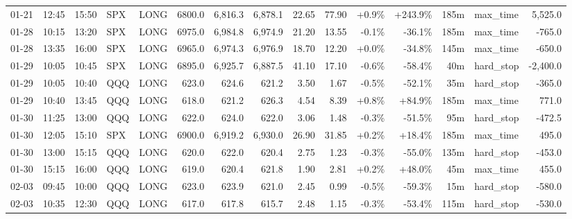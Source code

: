 \documentclass[11pt,a4paper,twoside]{article}
\begin{document}
\begin{landscape}
\begin{center}
\begin{longtable}{>{\color{txtmain}}l l l l l r r r r r r r r >{\color{txtmain}}l r}
01-21 & 12:45 & 15:50 & SPX & LONG & 6800.0 & 6,816.3 & 6,878.1 & 22.65 & 77.90 & \textcolor{wingreen}{+0.9\%} & \textcolor{wingreen}{+243.9\%} & 185m & max\_time & \textcolor{wingreen}{5,525.0} \\
01-28 & 10:15 & 13:20 & SPX & LONG & 6975.0 & 6,984.8 & 6,974.9 & 21.20 & 13.55 & \textcolor{lossred}{-0.1\%} & \textcolor{lossred}{-36.1\%} & 185m & max\_time & \textcolor{lossred}{-765.0} \\
01-28 & 13:35 & 16:00 & SPX & LONG & 6965.0 & 6,974.3 & 6,976.9 & 18.70 & 12.20 & \textcolor{wingreen}{+0.0\%} & \textcolor{lossred}{-34.8\%} & 145m & max\_time & \textcolor{lossred}{-650.0} \\
01-29 & 10:05 & 10:45 & SPX & LONG & 6895.0 & 6,925.7 & 6,887.5 & 41.10 & 17.10 & \textcolor{lossred}{-0.6\%} & \textcolor{lossred}{-58.4\%} & 40m & hard\_stop & \textcolor{lossred}{-2,400.0} \\
01-29 & 10:05 & 10:40 & QQQ & LONG & 623.0 & 624.6 & 621.2 & 3.50 & 1.67 & \textcolor{lossred}{-0.5\%} & \textcolor{lossred}{-52.1\%} & 35m & hard\_stop & \textcolor{lossred}{-365.0} \\
01-29 & 10:40 & 13:45 & QQQ & LONG & 618.0 & 621.2 & 626.3 & 4.54 & 8.39 & \textcolor{wingreen}{+0.8\%} & \textcolor{wingreen}{+84.9\%} & 185m & max\_time & \textcolor{wingreen}{771.0} \\
01-30 & 11:25 & 13:00 & QQQ & LONG & 622.0 & 624.0 & 622.0 & 3.06 & 1.48 & \textcolor{lossred}{-0.3\%} & \textcolor{lossred}{-51.5\%} & 95m & hard\_stop & \textcolor{lossred}{-472.5} \\
01-30 & 12:05 & 15:10 & SPX & LONG & 6900.0 & 6,919.2 & 6,930.0 & 26.90 & 31.85 & \textcolor{wingreen}{+0.2\%} & \textcolor{wingreen}{+18.4\%} & 185m & max\_time & \textcolor{wingreen}{495.0} \\
01-30 & 13:00 & 15:15 & QQQ & LONG & 620.0 & 622.0 & 620.4 & 2.75 & 1.23 & \textcolor{lossred}{-0.3\%} & \textcolor{lossred}{-55.0\%} & 135m & hard\_stop & \textcolor{lossred}{-453.0} \\
01-30 & 15:15 & 16:00 & QQQ & LONG & 619.0 & 620.4 & 621.8 & 1.90 & 2.81 & \textcolor{wingreen}{+0.2\%} & \textcolor{wingreen}{+48.0\%} & 45m & max\_time & \textcolor{wingreen}{455.0} \\
02-03 & 09:45 & 10:00 & QQQ & LONG & 623.0 & 623.9 & 621.0 & 2.45 & 0.99 & \textcolor{lossred}{-0.5\%} & \textcolor{lossred}{-59.3\%} & 15m & hard\_stop & \textcolor{lossred}{-580.0} \\
02-03 & 10:35 & 12:30 & QQQ & LONG & 617.0 & 617.8 & 615.7 & 2.48 & 1.15 & \textcolor{lossred}{-0.3\%} & \textcolor{lossred}{-53.4\%} & 115m & hard\_stop & \textcolor{lossred}{-530.0} \\

\end{longtable}
\end{center}
\end{landscape}
\end{document}

